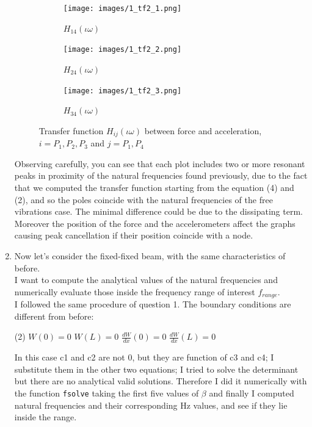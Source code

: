 \documentclass[11pt,a4paper]{article}
\begin{document}
\begin{enumerate}
	\begin{figure}[H]
		\centering
		\begin{subfigure}[b]{0.3\textwidth}
			\centering
			\texttt{[image: images/1\_tf2\_1.png]}
			\caption{$H_{14}(\iota\omega)$}
		\end{subfigure}
		\hfill
		\begin{subfigure}[b]{0.3\textwidth}
			\centering
			\texttt{[image: images/1\_tf2\_2.png]}
			\caption{$H_{24}(\iota\omega)$}
		\end{subfigure}
		\hfill
		\begin{subfigure}[b]{0.3\textwidth}
			\centering
			\texttt{[image: images/1\_tf2\_3.png]}
			\caption{$H_{34}(\iota\omega)$}
		\end{subfigure}
		\caption{Transfer function $H_{ij}(\iota\omega)$ between force and  acceleration, $i=P_1,P_2,P_3$ and $j=P_1,P_4$}
	\end{figure}

	Observing carefully, you can see that each plot includes two or more resonant peaks in proximity of the natural frequencies found previously, due to the fact that we computed the transfer function starting from the equation (4) and (2), and so the poles coincide with the natural frequencies of the free vibrations case. The minimal difference could be due to the dissipating term.\\ Moreover the position of the force and the accelerometers affect the graphs causing peak cancellation if their position coincide with a node.
	
	\medskip
	
	\item Now let's consider the fixed-fixed beam, with the same characteristics of before. \\
	I want to compute the analytical values of the natural frequencies and numerically evaluate those inside the frequency range of interest $f_{range}$. \\
	I followed the same procedure of question 1.
	The boundary conditions are different from before:
	
	\smallskip
	
	\begin{tasks}(2)
		\task[$\rightarrow$] $W(0)=0$
		\task[$\rightarrow$] $W(L)=0$
		\task[$\rightarrow$] $\frac{dW}{dx}(0)=0$
		\task[$\rightarrow$] $\frac{dW}{dx}(L)=0$
	\end{tasks}	
	
	\medskip
	
	In this case c1 and c2 are not 0, but they are function of c3 and c4; I substitute them in the other two equations; I tried to solve the determinant but there are no analytical valid solutions. Therefore I did it numerically with the function \texttt{fsolve} taking the first five values of $\beta$ and finally I computed natural frequencies and their corresponding Hz values, and see if they lie inside the range.
	

\end{enumerate}
\end{document}
